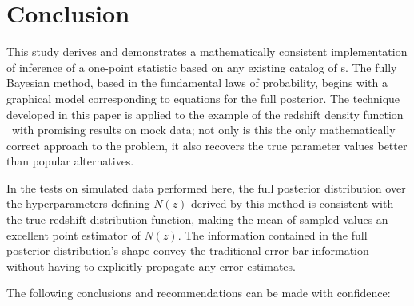 \section{Conclusion}


This study derives and demonstrates a mathematically consistent implementation of inference of a one-point statistic based on any existing catalog of \pzpdf s.  
The fully Bayesian method, based in the fundamental laws of probability, begins with a graphical model corresponding to equations for the full posterior.  
The technique developed in this paper is applied to the example of the redshift density function \nz\ with promising results on mock data; not only is this the only mathematically correct approach to the problem, it also recovers the true parameter values better than popular alternatives.  

In the tests on simulated data performed here, the full posterior distribution over the hyperparameters defining $N(z)$ derived by this method is consistent with the true redshift distribution function, making the mean of sampled values an excellent point estimator of $N(z)$.  
The information contained in the full posterior distribution's shape convey the traditional error bar information without having to explicitly propagate any error estimates.  

The following conclusions and recommendations can be made with confidence:


